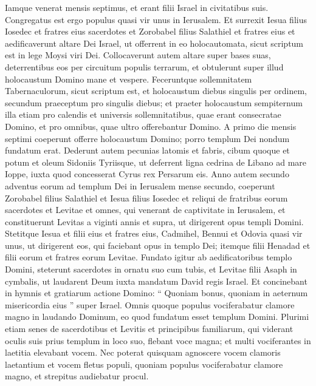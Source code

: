 \begin{biblechapter}
\begin{biblechapter}
\begin{biblechapter}
\verse Iamque venerat mensis septimus, et erant filii Israel in civitatibus suis. Congregatus est ergo populus quasi vir unus in Ierusalem. 
\verse Et surrexit Iesua filius Iosedec et fratres eius sacerdotes et Zorobabel filius Salathiel et fratres eius et aedificaverunt altare Dei Israel, ut offerrent in eo holocautomata, sicut scriptum est in lege Moysi viri Dei. 
\verse Collocaverunt autem altare super bases suas, deterrentibus eos per circuitum populis terrarum, et obtulerunt super illud holocaustum Domino mane et vespere. 
\verse Feceruntque sollemnitatem Tabernaculorum, sicut scriptum est, et holocaustum diebus singulis per ordinem, secundum praeceptum pro singulis diebus; 
\verse et praeter holocaustum sempiternum illa etiam pro calendis et universis sollemnitatibus, quae erant consecratae Domino, et pro omnibus, quae ultro offerebantur Domino. 
 \verse A primo die mensis septimi coeperunt offerre holocaustum Domino; porro templum Dei nondum fundatum erat.
 \verse Dederunt autem pecunias latomis et fabris, cibum quoque et potum et oleum Sidoniis Tyriisque, ut deferrent ligna cedrina de Libano ad mare Ioppe, iuxta quod concesserat Cyrus rex Persarum eis.
 \verse Anno autem secundo adventus eorum ad templum Dei in Ierusalem mense secundo, coeperunt Zorobabel filius Salathiel et Iesua filius Iosedec et reliqui de fratribus eorum sacerdotes et Levitae et omnes, qui venerant de captivitate in Ierusalem, et constituerunt Levitas a viginti annis et supra, ut dirigerent opus templi Domini. 
\verse Stetitque Iesua et filii eius et fratres eius, Cadmihel, Bennui et Odovia quasi vir unus, ut dirigerent eos, qui faciebant opus in templo Dei; itemque filii Henadad et filii eorum et fratres eorum Levitae.
 \verse Fundato igitur ab aedificatoribus templo Domini, steterunt sacerdotes in ornatu suo cum tubis, et Levitae filii Asaph in cymbalis, ut laudarent Deum iuxta mandatum David regis Israel. 
\verse Et concinebant in hymnis et gratiarum actione Domino: “ Quoniam bonus, quoniam in aeternum misericordia eius ” super Israel. Omnis quoque populus vociferabatur clamore magno in laudando Dominum, eo quod fundatum esset templum Domini. 
\verse Plurimi etiam senes de sacerdotibus et Levitis et principibus familiarum, qui viderant oculis suis prius templum in loco suo, flebant voce magna; et multi vociferantes in laetitia elevabant vocem. 
 \verse Nec poterat quisquam agnoscere vocem clamoris laetantium et vocem fletus populi, quoniam populus vociferabatur clamore magno, et strepitus audiebatur procul.
 

\end{biblechapter}
\end{biblechapter}
\end{biblechapter}
